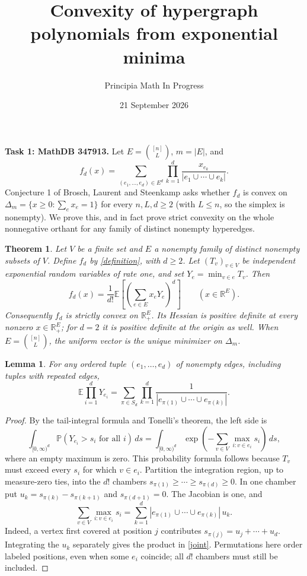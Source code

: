 \documentclass[11pt]{article}
\title{Convexity of hypergraph polynomials from exponential minima}
\author{Principia Math In Progress}
\date{21 September 2026}
\newtheorem{theorem}{Theorem}
\newtheorem{lemma}{Lemma}
\newcommand{\E}{\mathbb E}
\newcommand{\R}{\mathbb R}
\begin{document}
\maketitle
\noindent\textbf{Task 1: MathDB 347913.}
Let $E=\binom{[n]}L$, $m=|E|$, and
\begin{equation}\label{definition}
 f_d(x)=\sum_{(e_1,\ldots,e_d)\in E^d}
         \prod_{k=1}^d\frac{x_{e_k}}{|e_1\cup\cdots\cup e_k|}.
\end{equation}
Conjecture 1 of Brosch, Laurent and Steenkamp \cite{BLS} asks whether
$f_d$ is convex on $\Delta_m=\{x\geq0:\sum_e x_e=1\}$ for every
$n,L,d\geq2$ (with $L\leq n$, so the simplex is nonempty).
We prove this, and in fact prove strict convexity on the whole
nonnegative orthant for any family of distinct nonempty hyperedges.

\begin{theorem}\label{main}
Let $V$ be a finite set and $E$ a nonempty family of distinct nonempty
subsets of $V$. Define $f_d$ by \eqref{definition}, with $d\geq2$.
Let $(T_v)_{v\in V}$ be independent exponential random variables
of rate one, and set $Y_e=\min_{v\in e}T_v$. Then
\begin{equation}\label{moment}
 \boxed{\displaystyle f_d(x)=\frac1{d!}\E\left[
                      \left(\sum_{e\in E}x_eY_e\right)^d\right]}
 \qquad (x\in\R^E).
\end{equation}
Consequently $f_d$ is strictly convex on $\R_+^E$. Its Hessian is
positive definite at every nonzero $x\in\R_+^E$; for $d=2$ it is
positive definite at the origin as well. When $E=\binom{[n]}L$,
the uniform vector is the unique minimizer on $\Delta_m$.
\end{theorem}

\begin{lemma}\label{mixed}
For any ordered tuple $(e_1,\ldots,e_d)$ of nonempty edges, including
tuples with repeated edges,
\begin{equation}\label{joint}
 \E\prod_{i=1}^dY_{e_i}
 =\sum_{\pi\in S_d}\prod_{k=1}^d
       \frac1{|e_{\pi(1)}\cup\cdots\cup e_{\pi(k)}|}.
\end{equation}
\end{lemma}
\begin{proof}
By the tail-integral formula and Tonelli's theorem, the left side is
\[
 \int_{[0,\infty)^d}\mathbb P(Y_{e_i}>s_i\text{ for all }i)\,ds
 =\int_{[0,\infty)^d}
    \exp\left(-\sum_{v\in V}\max_{i:v\in e_i}s_i\right)\,ds,
\]
where an empty maximum is zero. This probability formula follows
because $T_v$ must exceed every $s_i$ for which $v\in e_i$.
Partition the integration region, up to measure-zero ties, into the
$d!$ chambers $s_{\pi(1)}\geq\cdots\geq s_{\pi(d)}\geq0$.
In one chamber put $u_k=s_{\pi(k)}-s_{\pi(k+1)}$ and
$s_{\pi(d+1)}=0$. The Jacobian is one, and
\[
 \sum_{v\in V}\max_{i:v\in e_i}s_i
 =\sum_{k=1}^d |e_{\pi(1)}\cup\cdots\cup e_{\pi(k)}|\,u_k.
\]
Indeed, a vertex first covered at position $j$ contributes
$s_{\pi(j)}=u_j+\cdots+u_d$.
Integrating the $u_k$ separately gives the product in \eqref{joint}.
Permutations here order labeled positions, even when some $e_i$
coincide; all $d!$ chambers must still be included.
\end{proof}
\end{document}
